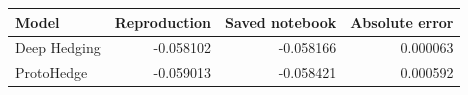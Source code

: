 \begin{tabular}{lrrr}
\toprule
Model & Reproduction & Saved notebook & Absolute error \\
\midrule
Deep Hedging & -0.058102 & -0.058166 & 0.000063 \\
ProtoHedge & -0.059013 & -0.058421 & 0.000592 \\
\bottomrule
\end{tabular}
